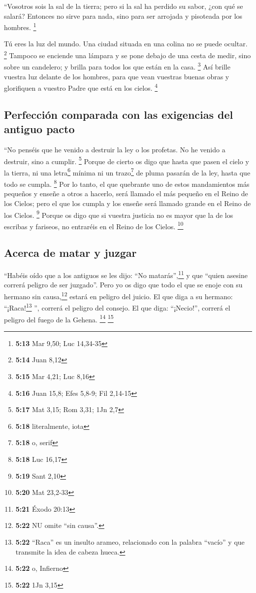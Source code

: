  ``Vosotros sois la sal de la tierra; pero si la sal ha
perdido su sabor, ¿con qué se salará? Entonces no sirve para nada, sino
para ser arrojada y pisoteada por los hombres. \footnote{\textbf{5:13}
  Mar 9,50; Luc 14,34-35}

 Tú eres la luz del mundo. Una ciudad situada en una
colina no se puede ocultar. \footnote{\textbf{5:14} Juan 8,12}
 Tampoco se enciende una lámpara y se pone debajo de una
cesta de medir, sino sobre un candelero; y brilla para todos los que
están en la casa. \footnote{\textbf{5:15} Mar 4,21; Luc 8,16}
 Así brille vuestra luz delante de los hombres, para que
vean vuestras buenas obras y glorifiquen a vuestro Padre que está en los
cielos. \footnote{\textbf{5:16} Juan 15,8; Efes 5,8-9; Fil 2,14-15}

\hypertarget{perfecciuxf3n-comparada-con-las-exigencias-del-antiguo-pacto}{%
\subsection{Perfección comparada con las exigencias del antiguo
pacto}\label{perfecciuxf3n-comparada-con-las-exigencias-del-antiguo-pacto}}

 ``No penséis que he venido a destruir la ley o los
profetas. No he venido a destruir, sino a cumplir. \footnote{\textbf{5:17}
  Mat 3,15; Rom 3,31; 1Jn 2,7}  Porque de cierto os digo
que hasta que pasen el cielo y la tierra, ni una letra\footnote{\textbf{5:18}
  literalmente, iota} mínima ni un trazo\footnote{\textbf{5:18} o, serif}
de pluma pasarán de la ley, hasta que todo se cumpla. \footnote{\textbf{5:18}
  Luc 16,17}  Por lo tanto, el que quebrante uno de estos
mandamientos más pequeños y enseñe a otros a hacerlo, será llamado el
más pequeño en el Reino de los Cielos; pero el que los cumpla y los
enseñe será llamado grande en el Reino de los Cielos. \footnote{\textbf{5:19}
  Sant 2,10}  Porque os digo que si vuestra justicia no
es mayor que la de los escribas y fariseos, no entraréis en el Reino de
los Cielos. \footnote{\textbf{5:20} Mat 23,2-33}

\hypertarget{acerca-de-matar-y-juzgar}{%
\subsection{Acerca de matar y juzgar}\label{acerca-de-matar-y-juzgar}}

 ``Habéis oído que a los antiguos se les dijo: ``No
matarás'',\footnote{\textbf{5:21} Éxodo 20:13} y que ``quien asesine
correrá peligro de ser juzgado''.  Pero yo os digo que
todo el que se enoje con su hermano sin causa,\footnote{\textbf{5:22} NU
  omite ``sin causa''.} estará en peligro del juicio. El que diga a su
hermano: ``¡Raca!\footnote{\textbf{5:22} ``Raca'' es un insulto arameo,
  relacionado con la palabra ``vacío'' y que transmite la idea de cabeza
  hueca.} '', correrá el peligro del consejo. El que diga: ``¡Necio!'',
correrá el peligro del fuego de la Gehena. \footnote{\textbf{5:22} o,
  Infierno} \footnote{\textbf{5:22} 1Jn 3,15}

